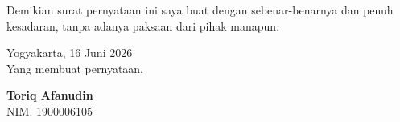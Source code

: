 \vspace{0.2cm}

\noindent Demikian surat pernyataan ini saya buat dengan sebenar-benarnya dan penuh kesadaran, tanpa adanya paksaan dari pihak manapun.

\vspace{0.8cm}

\begin{flushright}
    \begin{minipage}{0.4\textwidth}
        \raggedright
        Yogyakarta, 16 Juni 2026 \\
        Yang membuat pernyataan,\\
        \vspace{1.5cm}
        
        \textbf{Toriq Afanudin} \\
        NIM. 1900006105
    \end{minipage}
\end{flushright}
